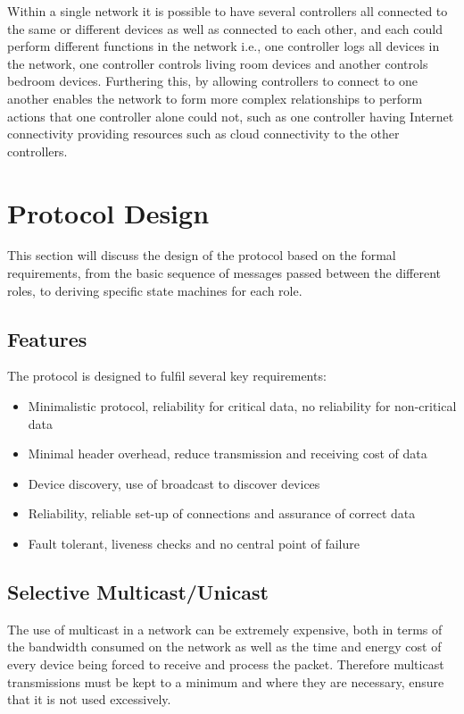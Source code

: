 Within a single network it is possible to have several controllers all connected to the same or different devices as well as connected to each other, and each could perform different functions in the network i.e., one controller logs all devices in the network, one controller controls living room devices and another controls bedroom devices. Furthering this, by allowing controllers to connect to one another enables the network to form more complex relationships to perform actions that one controller alone could not, such as one controller having Internet connectivity providing resources such as cloud connectivity to the other controllers.


\section{Protocol Design} %
\label{sec:protocol_design}
This section will discuss the design of the protocol based on the formal requirements, from the basic sequence of messages passed between the different roles, to deriving specific state machines for each role.

\subsection{Features} %
\label{sub:features}
The protocol is designed to fulfil several key requirements:
\begin{itemize}
	\item Minimalistic protocol, reliability for critical data, no reliability for non-critical data
	\item Minimal header overhead, reduce transmission and receiving cost of data
	\item Device discovery, use of broadcast to discover devices
	\item Reliability, reliable set-up of connections and assurance of correct data
	\item Fault tolerant, liveness checks and no central point of failure
\end{itemize}

\subsection{Selective Multicast/Unicast} %
\label{sub:selective_multicast_unicast}
The use of multicast in a network can be extremely expensive, both in terms of the bandwidth consumed on the network as well as the time and energy cost of every device being forced to receive and process the packet. Therefore multicast transmissions must be kept to a minimum and where they are necessary, ensure that it is not used excessively.

